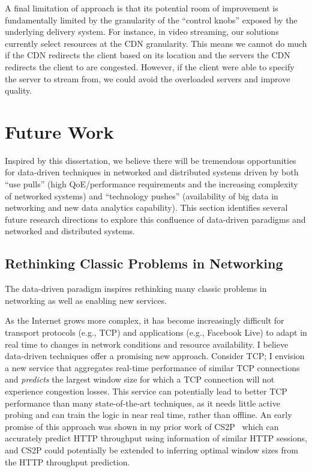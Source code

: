 A final limitation of \ddn approach is that its potential room of
improvement is fundamentally limited by the granularity of the 
``control knobs'' exposed
by  the underlying delivery system. 
For instance, in video streaming, our solutions currently select resources
at the CDN granularity. This means we cannot
do much if the CDN redirects the client based on its location
and the servers the CDN redirects the client to are
congested. However, if the client were able to specify
the server to stream from, we could avoid the overloaded
servers and improve quality.



\section{Future Work}
\label{sec:concl:future}

Inspired by this dissertation, we believe there 
will be tremendous opportunities for 
data-driven techniques in networked and distributed systems 
driven by both ``use pulls'' (high QoE/performance requirements and 
the increasing complexity of networked systems) and ``technology 
pushes'' (availability of big data in networking and new data 
analytics capability).
This section identifies several future research directions
to explore this confluence of data-driven paradigms and 
networked and distributed systems.

\subsection{Rethinking Classic Problems in Networking}

The data-driven paradigm inspires rethinking many classic 
problems in networking as well as enabling new services. 

As the Internet grows more complex, it has become increasingly difficult for transport protocols (e.g., TCP) and applications (e.g., Facebook Live) to adapt in real time to changes in network conditions and resource availability.
I believe data-driven techniques offer a promising new approach. Consider TCP;
I envision a new service that aggregates real-time performance of similar TCP connections and {\em predicts} the largest window size for which a TCP connection will not experience congestion losses.
This service can potentially lead to better TCP performance than many state-of-the-art techniques, as it needs little active probing and can train the logic in near real time, rather than offline. 
An early promise of this approach was shown in my prior work of CS2P~\cite{cs2p} which can accurately predict HTTP throughput using information of similar HTTP sessions, and CS2P could potentially be extended to inferring optimal window sizes from the HTTP throughput prediction.

